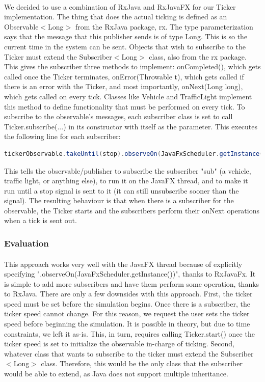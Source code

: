 \documentclass[a4paper,11pt,titlepage]{article}
\begin{document}
\paragraph{}
We decided to use a combination of RxJava and RxJavaFX for our Ticker implementation. The thing that does the actual ticking is defined as an Observable$<$Long$>$ from the RxJava package, rx. The type parameterization says that the message that this publisher sends is of type Long. This is so the current time in the system can be sent. Objects that wish to subscribe to the Ticker must extend the Subscriber$<$Long$>$ class, also from the rx package. This gives the subscriber three methods to implement: onCompleted(), which gets called once the Ticker terminates, onError(Throwable t), which gets called if there is an error with the Ticker, and most importantly, onNext(Long long), which gets called on every tick. Classes like Vehicle and TrafficLight implement this method to define functionality that must be performed on every tick. To subscribe to the observable's messages, each subscriber class is set to call Ticker.subscribe(...) in its constructor with itself as the parameter. This executes the following line for each subscriber:
\begin{lstlisting}[language=Java,breaklines=true,basicstyle=\small]
     tickerObservable.takeUntil(stop).observeOn(JavaFxScheduler.getInstance()).subscribe(sub);
\end{lstlisting}
This tells the observable/publisher to subscribe the subscriber "sub" (a vehicle, traffic light, or anything else), to run it on the JavaFX thread, and to make it run until a stop signal is sent to it (it can still unsubscribe sooner than the signal). The resulting behaviour is that when there is a subscriber for the observable, the Ticker starts and the subscribers perform their onNext operations when a tick is sent out.

\subsubsection{Evaluation}
\paragraph{}
This approach works very well with the JavaFX thread because of explicitly specifying ".observeOn(JavaFxScheduler.getInstance())", thanks to RxJavaFx. It is simple to add more subscribers and have them perform some operation, thanks to RxJava. There are only a few downsides with this approach. First, the ticker speed must be set before the simulation begins. Once there is a subscriber, the ticker speed cannot change. For this reason, we request the user sets the ticker speed before beginning the simulation. It is possible in theory, but due to time constraints, we left it as-is. This, in turn, requires calling Ticker.start() once the ticker speed is set to initialize the observable in-charge of ticking. Second, whatever class that wants to subscribe to the ticker must extend the Subscriber$<$Long$>$ class. Therefore, this would be the only class that the subscriber would be able to extend, as Java does not support multiple inheritance.
\end{document}

